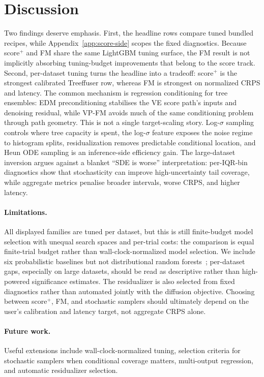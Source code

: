 \documentclass{tpm2026}
\begin{document}
\section{Discussion}\label{sec:disc}
Two findings deserve emphasis. First, the headline rows compare tuned bundled recipes, while Appendix~\ref{app:score-side} scopes the fixed diagnostics. Because score$^+$ and FM share the same LightGBM tuning surface, the FM result is not implicitly absorbing tuning-budget improvements that belong to the score track. Second, per-dataset tuning turns the headline into a tradeoff: score$^+$ is the strongest calibrated Treeffuser row, whereas FM is strongest on normalized CRPS and latency. The common mechanism is regression conditioning for tree ensembles: EDM preconditioning stabilises the VE score path's inputs and denoising residual, while VP-FM avoids much of the same conditioning problem through path geometry. This is not a single target-scaling story. Log-$\sigma$ sampling controls where tree capacity is spent, the log-$\sigma$ feature exposes the noise regime to histogram splits, residualization removes predictable conditional location, and Heun ODE sampling is an inference-side efficiency gain. The large-dataset inversion argues against a blanket ``SDE is worse'' interpretation: per-IQR-bin diagnostics show that stochasticity can improve high-uncertainty tail coverage, while aggregate metrics penalise broader intervals, worse CRPS, and higher latency.

\paragraph{Limitations.} All displayed families are tuned per dataset, but this is still finite-budget model selection with unequal search spaces and per-trial costs: the comparison is equal finite-trial budget rather than wall-clock-normalized model selection. We include six probabilistic baselines but not distributional random forests~\citep{cevid2022drf}; per-dataset gaps, especially on large datasets, should be read as descriptive rather than high-powered significance estimates. The residualizer is also selected from fixed diagnostics rather than automated jointly with the diffusion objective. Choosing between score$^+$, FM, and stochastic samplers should ultimately depend on the user's calibration and latency target, not aggregate CRPS alone.

\paragraph{Future work.} Useful extensions include wall-clock-normalized tuning, selection criteria for stochastic samplers when conditional coverage matters, multi-output regression, and automatic residualizer selection.
\end{document}

